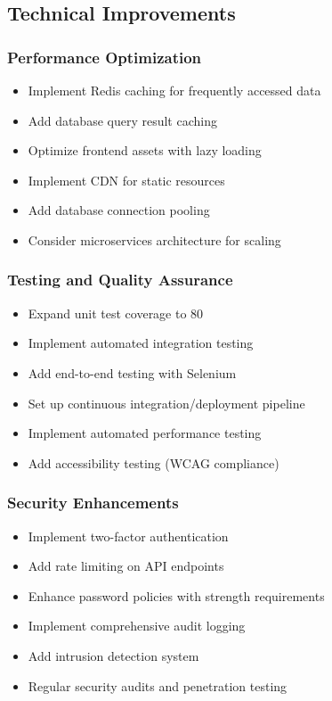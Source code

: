 \documentclass[12pt,a4paper]{report}
\newcommand{\JustifiedNormal}{\fontsize{12}{14}\selectfont\justifying\setlength{\parindent}{0pt}}
\begin{document}
\subsection{Technical Improvements}
\JustifiedNormal

\subsubsection{Performance Optimization}
\JustifiedNormal
\begin{itemize}
  \item Implement Redis caching for frequently accessed data
  \item Add database query result caching
  \item Optimize frontend assets with lazy loading
  \item Implement CDN for static resources
  \item Add database connection pooling
  \item Consider microservices architecture for scaling
\end{itemize}

\subsubsection{Testing and Quality Assurance}
\JustifiedNormal
\begin{itemize}
  \item Expand unit test coverage to 80%
  \item Implement automated integration testing
  \item Add end-to-end testing with Selenium
  \item Set up continuous integration/deployment pipeline
  \item Implement automated performance testing
  \item Add accessibility testing (WCAG compliance)
\end{itemize}

\subsubsection{Security Enhancements}
\JustifiedNormal
\begin{itemize}
  \item Implement two-factor authentication
  \item Add rate limiting on API endpoints
  \item Enhance password policies with strength requirements
  \item Implement comprehensive audit logging
  \item Add intrusion detection system
  \item Regular security audits and penetration testing
\end{itemize}
\end{document}
